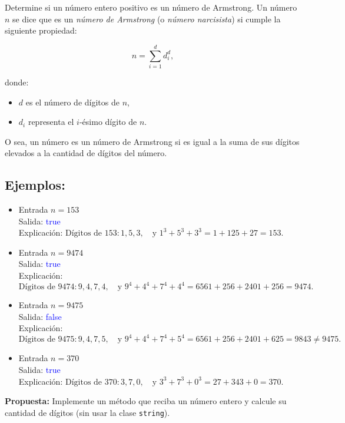 Determine si un número entero positivo es un número de Armstrong. Un número \( n \) se dice que es un \textit{número de Armstrong} (o \textit{número narcisista}) si cumple la siguiente propiedad:

\[
n = \sum_{i=1}^{d} d_i^d,
\]

donde:
\begin{itemize}
    \item \(d\) es el número de dígitos de \(n\),
    \item \(d_i\) representa el \(i\)-ésimo dígito de \(n\).
\end{itemize}

O sea, un número es un número de Armstrong si es igual a la suma de sus dígitos elevados a la cantidad de dígitos del número.

\subsection*{Ejemplos:}
\begin{itemize}
    \item Entrada \( n = 153 \)\\
    Salida: \textcolor{blue}{true}\\
    Explicación:
    \(
    \text{Dígitos de } 153: 1, 5, 3, \quad \text{y } 1^3 + 5^3 + 3^3 = 1 + 125 + 27 = 153.
    \)
    
    \item Entrada \( n = 9474 \)\\
    Salida: \textcolor{blue}{true}\\
    Explicación:
    \(
    \text{Dígitos de } 9474: 9, 4, 7, 4, \quad \text{y } 9^4 + 4^4 + 7^4 + 4^4 = 6561 + 256 + 2401 + 256 = 9474.
    \)

    \item Entrada \( n = 9475 \)\\
    Salida: \textcolor{blue}{false}\\
    Explicación:
    \(
    \text{Dígitos de } 9475: 9, 4, 7, 5, \quad \text{y } 9^4 + 4^4 + 7^4 + 5^4 = 6561 + 256 + 2401 + 625 = 9843 \neq 9475.
    \)
    
    \item Entrada \( n = 370 \)\\
    Salida: \textcolor{blue}{true}\\
    Explicación:
    \(
    \text{Dígitos de } 370: 3, 7, 0, \quad \text{y } 3^3 + 7^3 + 0^3 = 27 + 343 + 0 = 370.
    \)
\end{itemize}

\textbf{Propuesta:} Implemente un método que reciba un número entero y calcule su cantidad de dígitos (sin usar la clase \texttt{string}).
